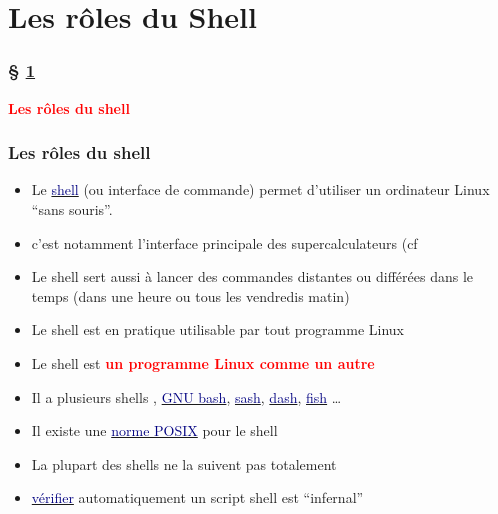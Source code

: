 \documentclass[lualatex,11pt,a4paper,svgnames,french]{beamer}
\newcommand{\clbhref}[2]{{\href{https:#1}{{\textcolor{Navy}{#2}}}}}
\newcommand{\clburl}[1]{{\href{https://#1}{\texttt{\relsize{-1}{\textbf{#1}}}}}}
\newcommand{\clbrougras}[1]{{\textcolor{Red}{\textbf{#1}}}}
\begin{document}
\section{Les rôles du Shell}
\label{sec:role-shell}
\begin{frame}\frametitle{§ \ref{sec:role-shell}}
{\Large \clbrougras{Les rôles du shell}}
\end{frame}
\begin{frame}\frametitle{Les rôles du shell}

  \begin{itemize}
  \item Le \clbhref{//fr.wikipedia.org/wiki/Shell_Unix}{shell} (ou interface de commande) permet d'utiliser un ordinateur Linux ``sans souris''.
  \item c'est notamment l'interface principale des supercalculateurs (cf \clburl{top500.org}
  \item Le shell sert aussi à lancer des commandes distantes ou différées dans le temps (dans une heure ou tous les vendredis matin)
  \item Le shell est en pratique utilisable par tout programme Linux
  \item Le shell est \clbrougras{un programme Linux comme un autre}
  \item Il a plusieurs shells \clburl{zsh.org},
    \clbhref{www.gnu.org/software/bash/}{GNU bash},
    \clbhref{//members.tip.net.au/~dbell/programs/sash-3.8.tar.gz}{sash},
    \clbhref{//fr.wikipedia.org/wiki/Debian_Almquist_shell}{dash},
    \clbhref{//fishshell.com/}{fish} \ldots
  \item Il existe une \clbhref{//pubs.opengroup.org/onlinepubs/9799919799/}{norme POSIX} pour le shell
  \item La plupart des shells ne la suivent pas totalement
  \item \clbhref{https://www.irif.fr/_media/rencontres/pps2018/regis-gianas.pdf}{vérifier} automatiquement un script shell est ``infernal''
  \end{itemize}
  \end{frame}
\end{document}
